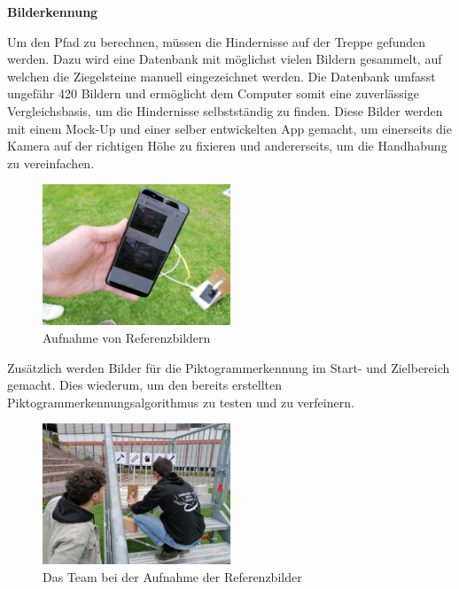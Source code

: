 \newpage
  
\textbf{Bilderkennung}

Um den Pfad zu berechnen, müssen die Hindernisse auf der Treppe gefunden werden. Dazu wird eine Datenbank mit möglichst vielen Bildern gesammelt, auf welchen die Ziegelsteine manuell eingezeichnet werden. Die Datenbank umfasst ungefähr 420 Bildern und ermöglicht dem Computer somit eine zuverlässige Vergleichsbasis, um die Hindernisse selbstständig zu finden. Diese Bilder werden mit einem Mock-Up und einer selber entwickelten App gemacht, um einerseits die Kamera auf der richtigen Höhe zu fixieren und andererseits, um die Handhabung zu vereinfachen.

\begin{figure}[H]
  \includegraphics[width=0.5\textwidth]{img/Sprint3/Sprint3_Bildersammlung.jpeg}
  \centering
  \caption{Aufnahme von Referenzbildern}
  \label{fig:Aufnahme der Referenzbilder}
  \end{figure}
  
Zusätzlich werden Bilder für die Piktogrammerkennung im Start- und Zielbereich gemacht. Dies wiederum, um den bereits erstellten Piktogrammerkennungsalgorithmus zu testen und zu verfeinern.
  
  \begin{figure}[H]
  \includegraphics[width=0.5\textwidth]{img/Sprint3/Sprint3_Bildersammlung2.jpeg}
  \centering
  \caption{Das Team bei der Aufnahme der Referenzbilder}
  \label{fig:Aufnahmeprozess der Referenzbilder}
  \end{figure}
  
